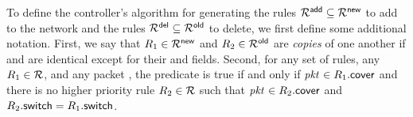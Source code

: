 To define the controller's algorithm for generating the rules
$\mathcal{R}^{\mathsf{add}} \subseteq \mathcal{R}^{\mathsf{new}}$ to add to the network and the rules
$\mathcal{R}^{\mathsf{del}} \subseteq \mathcal{R}^{\mathsf{old}}$ to delete, we first define some
additional notation.  First, we say that $\ruleID{1} \in \newRules$
and $\ruleID{2} \in \oldRules$ are \textit{copies} of one another if
 and  are identical except for their \epochField
and \tagTmpField fields.  Second, for any set  of rules, any
$\ruleID{1} \in \rules$, and any packet \pktID{}, the predicate
 is true if and only if
$\pktID{} \in \ruleID{1}{\coverField}$ and there is no higher priority
rule $\ruleID{2} \in \rules$ such that $\pktID{} \in
\ruleID{2}{\coverField}$ and $\ruleID{2}{\switchField} =
\ruleID{1}{\switchField}$.



